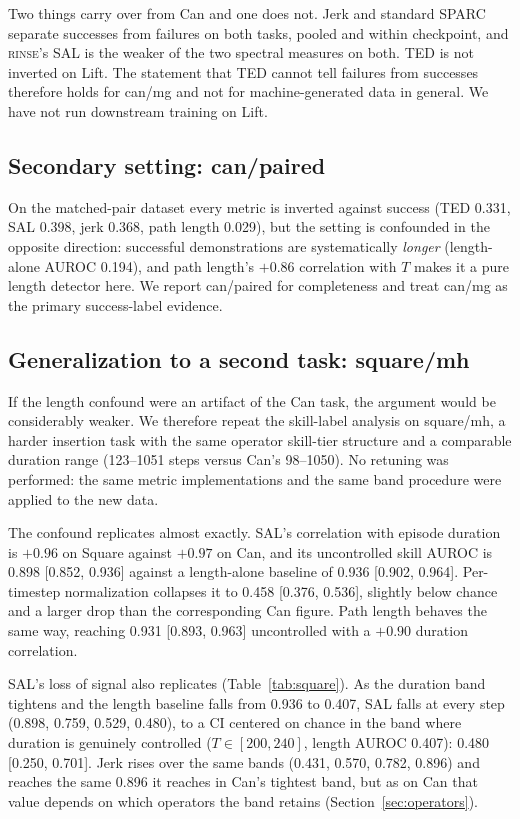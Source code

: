 \documentclass[10pt]{article}
\newcommand{\rinse}{\textmd{\textsc{rinse}}}
\begin{document}
Two things carry over from Can and one does not. Jerk and standard SPARC
separate successes from failures on both tasks, pooled and within
checkpoint, and \rinse{}'s SAL is the weaker of the two spectral measures on
both. TED is not inverted on Lift. The statement that TED cannot tell
failures from successes therefore holds for can/mg and not for
machine-generated data in general. We have not run downstream training on
Lift.

\subsection{Secondary setting: can/paired}

On the matched-pair dataset every metric is inverted against success (TED
0.331, SAL 0.398, jerk 0.368, path length 0.029), but the setting is
confounded in the opposite direction: successful demonstrations are
systematically \emph{longer} (length-alone AUROC 0.194), and path length's
$+0.86$ correlation with $T$ makes it a pure length detector here. We
report can/paired for completeness and treat can/mg as the primary
success-label evidence.

\subsection{Generalization to a second task: square/mh}
\label{sec:square}

If the length confound were an artifact of the Can task, the argument would
be considerably weaker. We therefore repeat the skill-label analysis on
square/mh, a harder insertion task with the same operator skill-tier
structure and a comparable duration range (123--1051 steps versus Can's
98--1050). No retuning was performed: the same metric implementations and
the same band procedure were applied to the new data.

The confound replicates almost exactly. SAL's correlation with episode
duration is $+0.96$ on Square against $+0.97$ on Can, and its uncontrolled
skill AUROC is 0.898 [0.852, 0.936] against a length-alone baseline of 0.936
[0.902, 0.964]. Per-timestep normalization collapses it to 0.458 [0.376,
0.536], slightly below chance and a larger drop than the corresponding Can
figure. Path length behaves the same way, reaching 0.931 [0.893, 0.963]
uncontrolled with a $+0.90$ duration correlation.

SAL's loss of signal also replicates (Table~\ref{tab:square}). As the
duration band tightens and the length baseline falls from 0.936 to 0.407,
SAL falls at every step (0.898, 0.759, 0.529, 0.480), to a CI centered on
chance in the band where duration is genuinely controlled ($T \in
[200,240]$, length AUROC 0.407): 0.480 [0.250, 0.701]. Jerk rises over the
same bands (0.431, 0.570, 0.782, 0.896) and reaches the same 0.896 it
reaches in Can's tightest band, but as on Can that value depends on which
operators the band retains (Section~\ref{sec:operators}).
\end{document}
